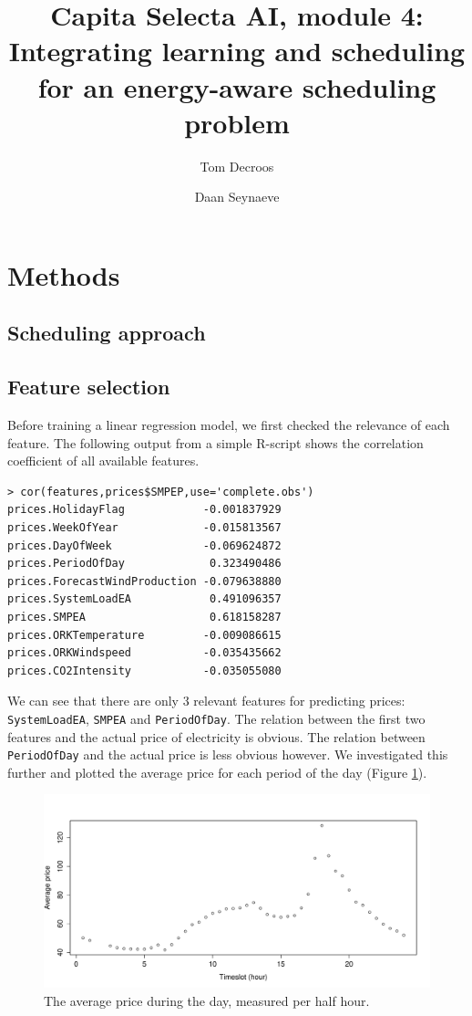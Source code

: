 \documentclass{article}
\title{Capita Selecta AI, module 4:\\ Integrating learning and scheduling for an energy-aware scheduling problem}
\author{Tom Decroos \and Daan Seynaeve}
\begin{document}
\maketitle
\begin{abstract}
\end{abstract}
\section{Methods}
\subsection{Scheduling approach}

\subsection{Feature selection}
Before training a linear regression model, we first checked the relevance of each feature. The following output from a simple R-script shows the correlation coefficient of all available features.
\begin{verbatim}
> cor(features,prices$SMPEP,use='complete.obs')
prices.HolidayFlag            -0.001837929
prices.WeekOfYear             -0.015813567
prices.DayOfWeek              -0.069624872
prices.PeriodOfDay             0.323490486
prices.ForecastWindProduction -0.079638880
prices.SystemLoadEA            0.491096357
prices.SMPEA                   0.618158287
prices.ORKTemperature         -0.009086615
prices.ORKWindspeed           -0.035435662
prices.CO2Intensity           -0.035055080
\end{verbatim}
We can see that there are only 3 relevant features for predicting prices: \verb|SystemLoadEA|, \verb|SMPEA| and \verb|PeriodOfDay|. The relation between the first two features and the actual price of electricity is obvious. The relation between \verb|PeriodOfDay| and the actual price is less obvious however. We investigated this further and plotted the average price for each period of the day (Figure \ref{fig:timeslot_average}).

\begin{figure}
	\centering
	\includegraphics[width=.8\textwidth]{img/timeslot_averageprice.pdf}
	\caption{The average price during the day, measured per half hour.}
	\label{fig:timeslot_average}
\end{figure}
\end{document}
